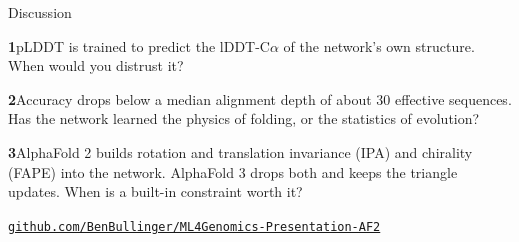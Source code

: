 \documentclass[11pt,aspectratio=169]{beamer}
\newcommand{\say}[1]{{\raggedright #1\par}\vspace{2.5mm}}
\begin{document}
\begin{frame}[t]{Discussion}
  \vspace{2mm}
  \say{{\color{ETHRed}\bfseries 1}\enspace pLDDT is trained to predict the lDDT-C$\alpha$ of the network's own structure. When would you distrust it?}
  \say{{\color{ETHRed}\bfseries 2}\enspace Accuracy drops below a median alignment depth of about 30 effective sequences. Has the network learned the physics of folding, or the statistics of evolution?}
  \say{{\color{ETHRed}\bfseries 3}\enspace AlphaFold 2 builds rotation and translation invariance (IPA) and chirality (FAPE) into the network. AlphaFold 3 drops both and keeps the triangle updates. When is a built-in constraint worth it?}
  \vfill
  {\centering\scriptsize\href{https://github.com/BenBullinger/ML4Genomics-Presentation-AF2}{\color{ETHGray}\texttt{github.com/BenBullinger/ML4Genomics-Presentation-AF2}}\par}
\end{frame}
\end{document}
